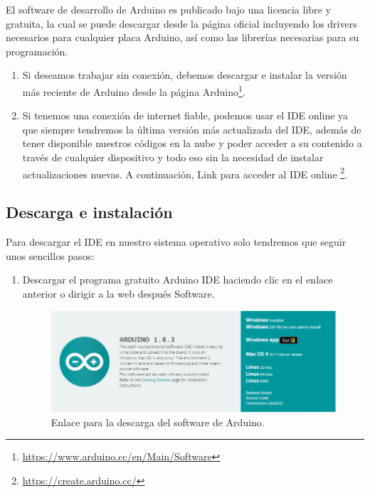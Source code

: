 \begin{appendix}
El software de desarrollo de Arduino es publicado bajo una licencia libre y gratuita, la cual se puede descargar desde la página oficial
incluyendo los drivers necesarios para cualquier placa Arduino, así como las librerías necesarias para su programación.

\begin{enumerate}
 \item Si deseamos trabajar sin conexión, debemos descargar e instalar la versión más reciente
de Arduino desde la página Arduino\footnote{\url{https://www.arduino.cc/en/Main/Software}}.
\item Si tenemos una conexión de internet fiable, podemos usar el IDE online ya que siempre
tendremos la última versión más actualizada del IDE, además de tener disponible
nuestros códigos en la nube y poder acceder a su contenido a través de cualquier
dispositivo y todo eso sin la necesidad de instalar actualizaciones nuevas. A
continuación, Link para acceder al IDE online \footnote{ \url{https://create.arduino.cc/}}.
\end{enumerate}

\subsection{Descarga e instalación}

Para descargar el IDE en nuestro sistema operativo solo tendremos que seguir unos sencillos
pasos:

\begin{enumerate}
 \item Descargar el programa gratuito Arduino IDE haciendo clic en el enlace anterior o dirigir a
la web después Software.


\begin{figure}[H]
  \begin{center}
    \includegraphics[scale=0.3]{imagenes/descarga_arduino.png}
  \end{center}
  \label{fig:descarga_arduino}
 \caption{Enlace para la descarga del software de Arduino.}
 \end{figure}
 

\end{enumerate}
\end{appendix}
